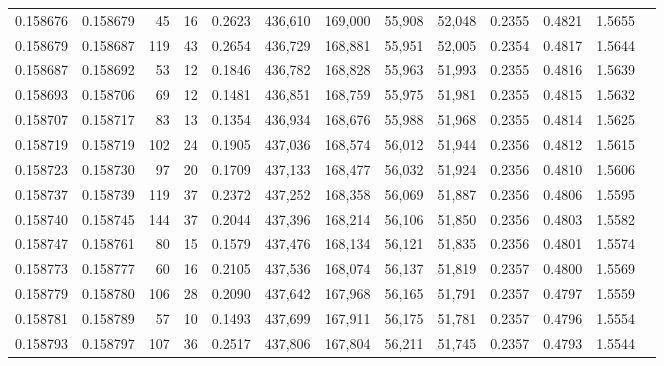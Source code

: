 \begin{tabular}{rrrrrrrrrrrrr}
0.158676 & 0.158679 &    45 &  16 &                                     0.2623 & 436,610 & 169,000 &  55,908 &  52,048 & 0.2355 & 0.4821 & 1.5655 \\
0.158679 & 0.158687 &   119 &  43 &                                     0.2654 & 436,729 & 168,881 &  55,951 &  52,005 & 0.2354 & 0.4817 & 1.5644 \\
0.158687 & 0.158692 &    53 &  12 &                                     0.1846 & 436,782 & 168,828 &  55,963 &  51,993 & 0.2355 & 0.4816 & 1.5639 \\
0.158693 & 0.158706 &    69 &  12 &                                     0.1481 & 436,851 & 168,759 &  55,975 &  51,981 & 0.2355 & 0.4815 & 1.5632 \\
0.158707 & 0.158717 &    83 &  13 &                                     0.1354 & 436,934 & 168,676 &  55,988 &  51,968 & 0.2355 & 0.4814 & 1.5625 \\
0.158719 & 0.158719 &   102 &  24 &                                     0.1905 & 437,036 & 168,574 &  56,012 &  51,944 & 0.2356 & 0.4812 & 1.5615 \\
0.158723 & 0.158730 &    97 &  20 &                                     0.1709 & 437,133 & 168,477 &  56,032 &  51,924 & 0.2356 & 0.4810 & 1.5606 \\
0.158737 & 0.158739 &   119 &  37 &                                     0.2372 & 437,252 & 168,358 &  56,069 &  51,887 & 0.2356 & 0.4806 & 1.5595 \\
0.158740 & 0.158745 &   144 &  37 &                                     0.2044 & 437,396 & 168,214 &  56,106 &  51,850 & 0.2356 & 0.4803 & 1.5582 \\
0.158747 & 0.158761 &    80 &  15 &                                     0.1579 & 437,476 & 168,134 &  56,121 &  51,835 & 0.2356 & 0.4801 & 1.5574 \\
0.158773 & 0.158777 &    60 &  16 &                                     0.2105 & 437,536 & 168,074 &  56,137 &  51,819 & 0.2357 & 0.4800 & 1.5569 \\
0.158779 & 0.158780 &   106 &  28 &                                     0.2090 & 437,642 & 167,968 &  56,165 &  51,791 & 0.2357 & 0.4797 & 1.5559 \\
0.158781 & 0.158789 &    57 &  10 &                                     0.1493 & 437,699 & 167,911 &  56,175 &  51,781 & 0.2357 & 0.4796 & 1.5554 \\
0.158793 & 0.158797 &   107 &  36 &                                     0.2517 & 437,806 & 167,804 &  56,211 &  51,745 & 0.2357 & 0.4793 & 1.5544 \\

\end{tabular}
